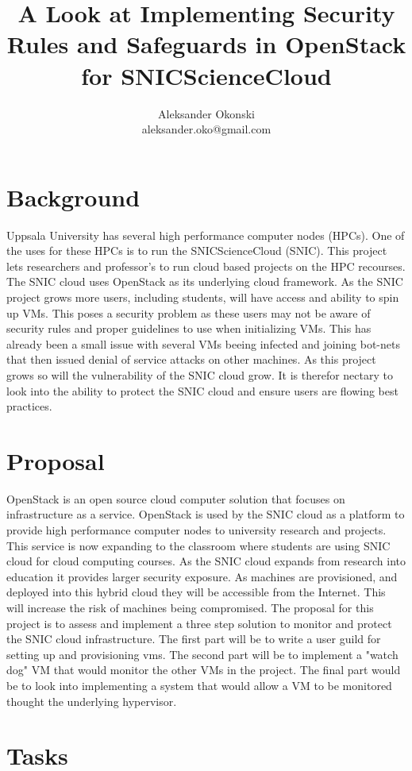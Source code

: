 \documentclass[12pt]{article}
\title{A Look at Implementing Security Rules and Safeguards in OpenStack for SNICScienceCloud}
\author{Aleksander Okonski \\ aleksander.oko@gmail.com}
\date{}
\begin{document}
\maketitle

\section{Background}
Uppsala University has several high performance computer nodes (HPCs). One of the uses for these HPCs is to run the SNICScienceCloud (SNIC). This project lets researchers and professor's to run cloud based projects on the HPC recourses. The SNIC cloud uses OpenStack as its underlying cloud framework. As the SNIC project grows more users, including students, will have access and ability to spin up VMs. This poses a security problem as these users may not be aware of security rules and proper guidelines to use when initializing VMs. This has already been a small issue with several VMs beeing infected and joining bot-nets that then issued denial of service attacks on other machines. As this project grows so will the vulnerability of the SNIC cloud grow. It is therefor nectary to look into the ability to protect the SNIC cloud and ensure users are flowing best practices.


\section{Proposal}
OpenStack is an open source cloud computer solution that focuses on infrastructure as a service. OpenStack is used by the SNIC cloud as a platform to provide high performance computer nodes to university research and projects. This service is now expanding to the classroom where students are using SNIC cloud for cloud computing courses. As the SNIC cloud expands from research into education it provides larger security exposure. As machines are provisioned, and deployed into this hybrid cloud they will be accessible from the Internet. This will increase the risk of machines being compromised. The proposal for this project is to assess and implement a three step solution to monitor and protect the SNIC cloud infrastructure. The first part will be to write a user guild for setting up and provisioning vms. The second part will be to implement a "watch dog" VM that would monitor the other VMs in the project. The final part would be to look into implementing a system that would allow a VM to be monitored thought the underlying hypervisor.

\section{Tasks}
\end{document}
